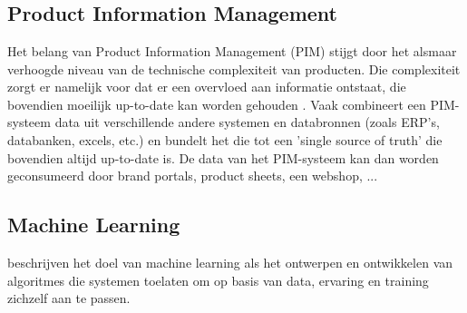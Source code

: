 \chapter{}%
\label{ch:stand-van-zaken}



\section{Product Information Management}
Het belang van Product Information Management (PIM) stijgt door het alsmaar verhoogde niveau van de technische complexiteit  van producten. Die complexiteit zorgt er namelijk voor dat er een overvloed aan informatie ontstaat, die bovendien moeilijk up-to-date kan worden gehouden \autocite{Fr_mling_2006}. Vaak combineert een PIM-systeem data uit verschillende andere systemen en databronnen (zoals ERP's, databanken, excels, etc.) en bundelt het die tot een 'single source of truth' die bovendien altijd up-to-date is. De data van het PIM-systeem kan dan worden geconsumeerd door brand portals, product sheets, een webshop, ...
\section{Machine Learning}
\textcite{Hu2013} beschrijven het doel van machine learning als het ontwerpen en ontwikkelen van algoritmes die systemen toelaten om op basis van data, ervaring en training zichzelf aan te passen. 
